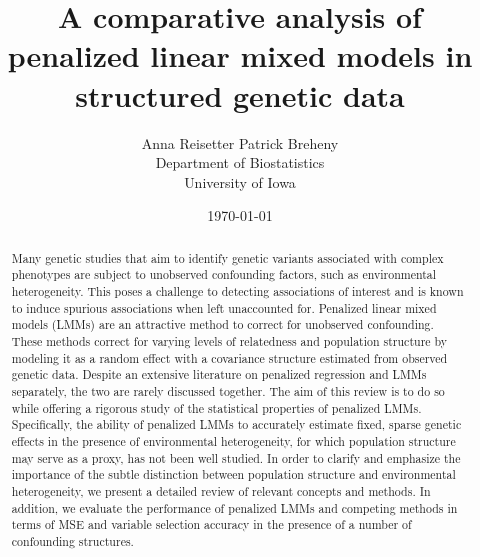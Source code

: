 \documentclass[a4paper]{article}
\title{A comparative analysis of penalized linear mixed models in structured genetic data}
\author{Anna Reisetter \qquad Patrick Breheny\\
  Department of Biostatistics\\University of Iowa}
\date{\today}
\begin{document}
\maketitle

\begin{abstract}
Many genetic studies that aim to identify genetic variants associated with complex phenotypes are subject to unobserved confounding factors, such as environmental heterogeneity. This poses a challenge to detecting associations of interest and is known to induce spurious associations when left unaccounted for. Penalized linear mixed models (LMMs) are an attractive method to correct for unobserved confounding. These methods correct for varying levels of relatedness and population structure by modeling it as a random effect with a covariance structure estimated from observed genetic data. Despite an extensive literature on penalized regression and LMMs separately, the two are rarely discussed together. The aim of this review is to do so while offering a rigorous study of the statistical properties of penalized LMMs. Specifically, the ability of penalized LMMs to accurately estimate fixed, sparse genetic effects in the presence of environmental heterogeneity, for which population structure may serve as a proxy, has not been well studied. In order to clarify and emphasize the importance of the subtle distinction between population structure and environmental heterogeneity, we present a detailed review of relevant concepts and methods. In addition, we evaluate the performance of penalized LMMs and competing methods in terms of MSE and variable selection accuracy in the presence of a number of confounding structures.
\end{abstract}



\newpage



\end{document}
